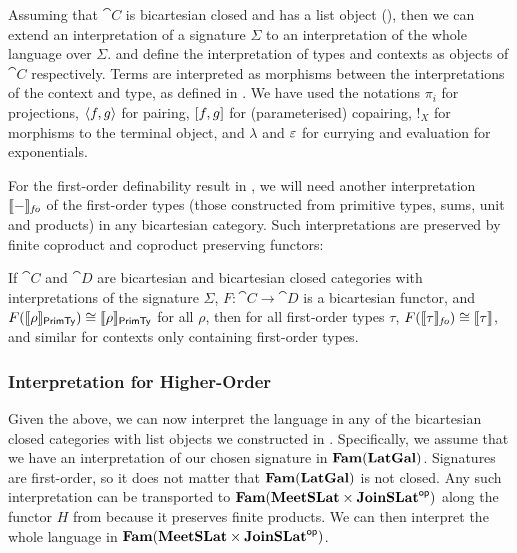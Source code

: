 Assuming that $\cat{C}$ is bicartesian closed and has a list object (), then we can extend an
interpretation of a signature $\Sigma$ to an interpretation of the whole language over
$\Sigma$.  and  define the interpretation of types and
contexts as objects of $\cat{C}$ respectively. Terms are interpreted as morphisms between the interpretations
of the context and type, as defined in . We have used the notations $\pi_i$ for
projections, $\langle f, g\rangle$ for pairing, $[f, g]$ for (parameterised) copairing, $!_X$ for morphisms
to the terminal object, and $\lambda$ and $\varepsilon$ for currying and evaluation for exponentials.

For the first-order definability result in , we will need another interpretation
$\llbracket - \rrbracket_{\mathit{fo}}$ of the first-order types (those constructed from primitive types, sums, unit and
products) in any bicartesian category. Such interpretations are preserved by finite coproduct and coproduct
preserving functors:

\begin{lemma}\label{lem:first-order-agreement-types}
  If $\cat{C}$ and $\cat{D}$ are bicartesian and bicartesian closed categories with interpretations of the
  signature $\Sigma$, $F : \cat{C} \to \cat{D}$ is a bicartesian functor, and
  $F(\llbracket \rho \rrbracket_{\mathsf{PrimTy}}) \cong \llbracket \rho \rrbracket_{\mathsf{PrimTy}}$ for all $\rho$, then for all first-order types $\tau$,
  $F(\llbracket \tau \rrbracket_{\mathit{fo}}) \cong \llbracket \tau \rrbracket$, and similar for contexts only containing first-order types.
\end{lemma}

\subsubsection{Interpretation for Higher-Order \GPS}
\label{sec:language:gps-interpretation}

Given the above, we can now interpret the language in any of the bicartesian closed categories with list
objects we constructed in . Specifically, we assume that we have an interpretation
of our chosen signature in $\mathbf{Fam}(\mathbf{LatGal})$. Signatures are first-order, so it does not matter that
$\mathbf{Fam}(\mathbf{LatGal})$ is not closed. Any such interpretation can be transported to
$\mathbf{Fam}(\mathbf{MeetSLat} \times \mathbf{JoinSLat}^{\mathsf{op}})$ along the functor $H$ from  because it preserves
finite products. We can then interpret the whole language in $\mathbf{Fam}(\mathbf{MeetSLat} \times \mathbf{JoinSLat}^{\mathsf{op}})$.

